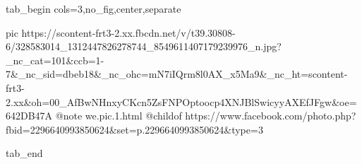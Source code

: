 
 
 
 
 


\ifcmt
  tab_begin cols=3,no_fig,center,separate

     pic https://scontent-frt3-2.xx.fbcdn.net/v/t39.30808-6/328583014_1312447826278744_8549611407179239976_n.jpg?_nc_cat=101&ccb=1-7&_nc_sid=dbeb18&_nc_ohc=mN7iIQrm8l0AX_x5Ma9&_nc_ht=scontent-frt3-2.xx&oh=00_AfBwNHnxyCKcn5ZsFNPOptoocp4XNJBlSwicyyAXEfJFgw&oe=642DB47A
		 @note we.pic.1.html
		 @childof https://www.facebook.com/photo.php?fbid=2296640993850624&set=p.2296640993850624&type=3

  tab_end
\fi
